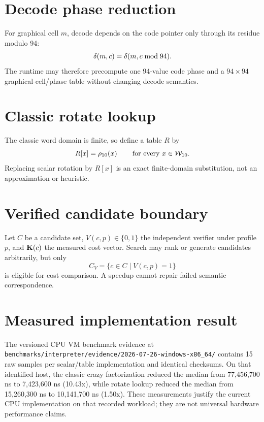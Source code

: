 \documentclass{article}
\begin{document}
\section{Decode phase reduction}

For graphical cell $m$, decode depends on the code pointer only through its
residue modulo 94:
\begin{equation}
  \delta(m,c)=\delta(m,c\bmod94).
  \label{eq:optimization-decode-phase}
\end{equation}
The runtime may therefore precompute one 94-value code phase and a
$94\times94$ graphical-cell/phase table without changing decode semantics.

\section{Classic rotate lookup}

The classic word domain is finite, so define a table $R$ by
\begin{equation}
  R[x]=\rho_{10}\!\left(x\right)
  \qquad\text{for every }x\in\mathcal{W}_{10}.
  \label{eq:optimization-rotate-table}
\end{equation}
Replacing scalar rotation by $R[x]$ is an exact finite-domain substitution, not
an approximation or heuristic.

\section{Verified candidate boundary}

Let $C$ be a candidate set, $V(c,p)\in\{0,1\}$ the independent verifier under
profile $p$, and $\mathbf{K}\!\left(c\right)$ the measured cost vector. Search may rank or
generate candidates arbitrarily, but only
\[
  C_V=\{c\in C\mid V(c,p)=1\}
\]
is eligible for cost comparison. A speedup cannot repair failed semantic
correspondence.

\section{Measured implementation result}

The versioned CPU VM benchmark evidence at
\texttt{benchmarks/interpreter/evidence/2026-07-26-windows-x86\_64/} contains 15 raw
samples per scalar/table implementation and identical checksums. On that
identified host, the classic crazy factorization reduced the median from
77,456,700 ns to 7,423,600 ns (10.43x), while rotate lookup reduced the median
from 15,260,300 ns to 10,141,700 ns (1.50x). These measurements justify the
current CPU implementation on that recorded workload; they are not universal
hardware performance claims.
\end{document}
